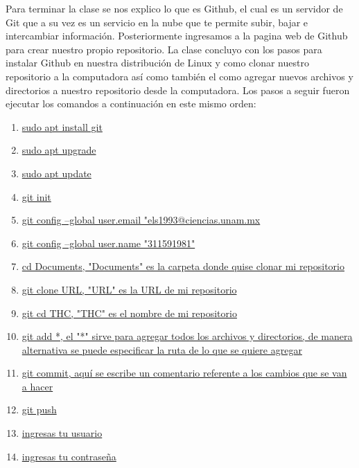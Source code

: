 \documentclass[letterpaper, 12pt, oneside]{article}
\begin{document}
	Para terminar la clase se nos explico lo que es Github, el cual es un servidor de Git que a su vez es un servicio en la nube que te permite subir, bajar e intercambiar información. Posteriormente ingresamos a la pagina web de Github para crear nuestro propio repositorio. La clase concluyo con los pasos para instalar Github en nuestra distribución de Linux y como clonar nuestro repositorio a la computadora así como también el como agregar nuevos archivos y directorios a nuestro repositorio desde la computadora. Los pasos a seguir fueron ejecutar los comandos a continuación en este mismo orden:
	\begin{enumerate}
		\item \underline{sudo apt install git}
		\item \underline{sudo apt upgrade}
		\item \underline{sudo apt update}
		\item \underline{git init}
		\item \underline{git config --global user.email "els1993@ciencias.unam.mx}
		\item \underline{git config --global user.name "311591981"}
		\item \underline{cd Documents, "Documents" es la carpeta donde quise clonar mi repositorio}
		\item \underline{git clone URL, "URL" es la URL de mi repositorio}
		\item \underline{git cd THC, "THC" es el nombre de mi repositorio}
		\item \underline{git add *, el "*" sirve para agregar todos los archivos y directorios, de manera alternativa se puede especificar la ruta de lo que se quiere agregar}
		\item \underline{git commit, aquí se escribe un comentario referente a los cambios que se van a hacer}
		\item \underline{git push}
		\item \underline{ingresas tu usuario}
		\item \underline{ingresas tu contraseña}	\end{enumerate}
\end{document}

